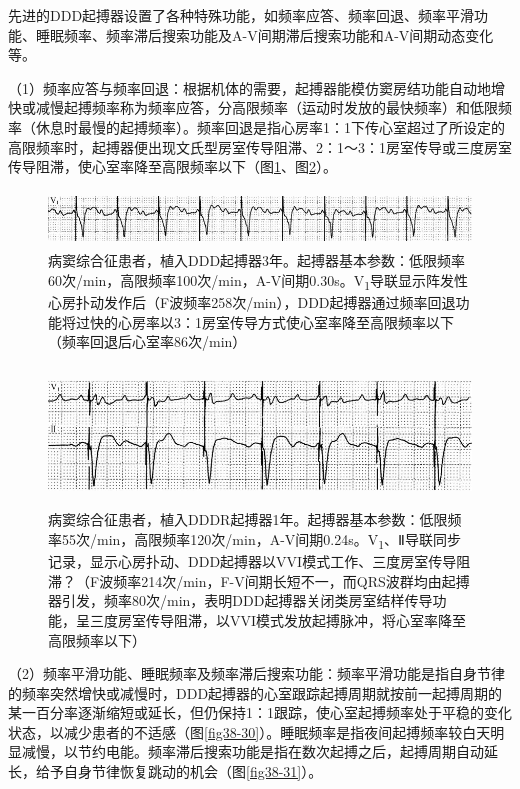 先进的DDD起搏器设置了各种特殊功能，如频率应答、频率回退、频率平滑功能、睡眠频率、频率滞后搜索功能及A-V间期滞后搜索功能和A-V间期动态变化等。

（1）频率应答与频率回退：根据机体的需要，起搏器能模仿窦房结功能自动地增快或减慢起搏频率称为频率应答，分高限频率（运动时发放的最快频率）和低限频率（休息时最慢的起搏频率）。频率回退是指心房率1：1下传心室超过了所设定的高限频率时，起搏器便出现文氏型房室传导阻滞、2：1～3：1房室传导或三度房室传导阻滞，使心室率降至高限频率以下（图\ref{fig38-28}、图\ref{fig38-29}）。

\begin{figure}[!htbp]
 \centering
 \includegraphics[width=5.58333in,height=0.58333in]{./images/Image00631.jpg}
 \captionsetup{justification=centering}
 \caption{病窦综合征患者，植入DDD起搏器3年。起搏器基本参数：低限频率60次/min，高限频率100次/min，A-V间期0.30s。V\textsubscript{1}导联显示阵发性心房扑动发作后（F波频率258次/min），DDD起搏器通过频率回退功能将过快的心房率以3：1房室传导方式使心室率降至高限频率以下（频率回退后心室率86次/min）}
 \label{fig38-28}
  \end{figure} 


\begin{figure}[!htbp]
 \centering
 \includegraphics[width=5.58333in,height=1.45833in]{./images/Image00632.jpg}
 \captionsetup{justification=centering}
 \caption{病窦综合征患者，植入DDDR起搏器1年。起搏器基本参数：低限频率55次/min，高限频率120次/min，A-V间期0.24s。V\textsubscript{1}、Ⅱ导联同步记录，显示心房扑动、DDD起搏器以VVI模式工作、三度房室传导阻滞？（F波频率214次/min，F-V间期长短不一，而QRS波群均由起搏器引发，频率80次/min，表明DDD起搏器关闭类房室结样传导功能，呈三度房室传导阻滞，以VVI模式发放起搏脉冲，将心室率降至高限频率以下）}
 \label{fig38-29}
  \end{figure} 


（2）频率平滑功能、睡眠频率及频率滞后搜索功能：频率平滑功能是指自身节律的频率突然增快或减慢时，DDD起搏器的心室跟踪起搏周期就按前一起搏周期的某一百分率逐渐缩短或延长，但仍保持1：1跟踪，使心室起搏频率处于平稳的变化状态，以减少患者的不适感（图\ref{fig38-30}）。睡眠频率是指夜间起搏频率较白天明显减慢，以节约电能。频率滞后搜索功能是指在数次起搏之后，起搏周期自动延长，给予自身节律恢复跳动的机会（图\ref{fig38-31}）。


